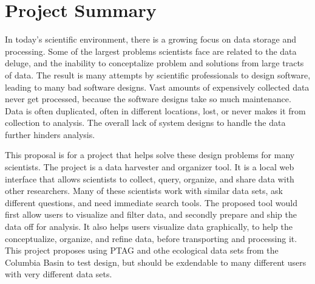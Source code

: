 

 


\section{Project Summary}
In today's scientific environment, there is a growing focus on data storage and
processing. Some of the largest problems scientists face are related to the data
deluge, and the inability to conceptalize problem and solutions from large
tracts of data. The result is many attempts by scientific professionals to 
design software, leading to many bad software designs. Vast amounts of 
expensively collected data never get processed, 
because the software designs take so much maintenance. Data is often duplicated,
often in different locations, lost, or never makes it from collection to 
analysis. The overall lack of system designs to handle the data further 
hinders analysis.

This proposal is for a project that helps solve these design problems for 
many scientists. The project is a data harvester and organizer tool. It
is a local web interface that allows scientists to collect, query, organize, 
and share data with other researchers.
Many of these scientists work with similar data sets, ask different 
questions, and need immediate search tools. The proposed tool would first allow 
users to visualize and filter data, and secondly prepare and ship the data
off for analysis. It also helps users visualize data graphically, to 
help the conceptualize, organize, and refine data, before transporting and 
processing it. This 
project proposes using PTAG and othe ecological data sets from the Columbia 
Basin to test design, but should be exdendable to many different users with very
different data sets.

